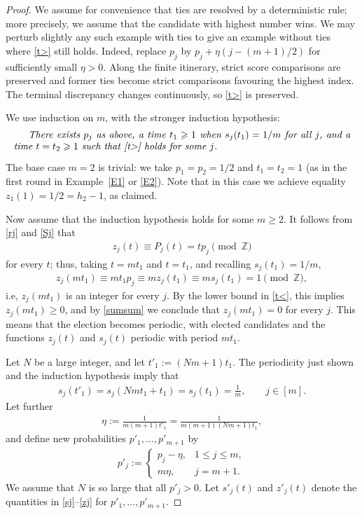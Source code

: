 \documentclass[11pt,reqno,tbtags,a4paper]{amsart}
\numberwithin{equation}{section}
\renewcommand\le{\leq}
\renewcommand\ge{\geq}
\renewcommand\leq{\leqslant}
\renewcommand\geq{\geqslant}
\theoremstyle{plain}%
\theoremstyle{definition}
\theoremstyle{remark}
\newcounter{cases}
\newcommand{\refE}[1]{Example~\ref{#1}}
\newcommand\punkt{\xperiod}    %
\newcommand\ie{i.e\punkt}
\newcommand\bbZ{\mathbb Z}
\newcommand\0{{\boldsymbol 0}}
\newcommand\1{{\boldsymbol 1}}
\begin{document}
\begin{proof}
We assume
for convenience that ties are resolved by a deterministic rule;
more precisely, we assume that the candidate with highest number wins.
We may perturb slightly any such example with ties to give an example
without ties where \eqref{t>} still holds. Indeed, replace $p_j$ by
$p_j+\eta(j-(m+1)/2)$ for sufficiently small $\eta>0$.
Along the finite itinerary, strict score comparisons are preserved and
former ties become strict comparisons favouring the highest index. The terminal discrepancy
changes continuously, so \eqref{t>} is preserved.

We use induction on $m$, with the stronger induction hypothesis:
%
%
%
\begin{equation*}
\vbox{\em There exists $p_j$ as above, a time $t_1\ge1$ when $s_j(t_1)=1/m$ 
for all $j$, and a time $t=t_2\ge1$ such that \eqref{t>} holds for some $j$.}
\end{equation*}
%
The base case $m=2$ is trivial: we take $p_1=p_2=1/2$ and $t_1=t_2=1$
(as in the first round in \refE{E1} or \ref{E2}).
Note that in this case we achieve equality $z_1(1)=1/2=h_2-1$, as claimed.


Now assume that the induction hypothesis holds for some $m\ge2$.
It follows from \eqref{rj} and \eqref{Sj} that
\begin{align}\label{dix4}
  z_j(t)
\equiv  P_j(t)=tp_j \pmod \bbZ
\end{align}
for every $t$; thus, taking $t=mt_1$ and $t=t_1$, and recalling $s_j(t_1)=1/m$, 
\begin{align}\label{dix5}
  z_j(mt_1)\equiv mt_1p_j \equiv mz_j(t_1)
\equiv m s_j(t_1)
=1\pmod\bbZ,
\end{align}
\ie, $z_j(mt_1)$ is an integer for every $j$.
By the lower bound in \eqref{t<}, 
this implies $z_j(mt_1)\ge0$, and by \eqref{sumsum} we
conclude that $z_j(mt_1)=0$ for every $j$. This means that the election
becomes periodic, with elected candidates and the functions $z_j(t)$ and
$s_j(t)$ periodic with period $mt_1$.

Let $N$ be a large integer, 
and let $t'_1:=(Nm+1)t_1$.
The periodicity just shown and the induction hypothesis imply that
\begin{align}\label{dix6}
  s_j(t'_1)=s_j(Nmt_1+t_1)=s_j(t_1)=\frac{1}{m},
\qquad j\in[m].
\end{align}
Let further
\begin{align}\label{dix7}
  \eta:=\frac{1}{m(m+1)t'_1}
=\frac{1}{m(m+1)(Nm+1)t_1},
\end{align}
and define new probabilities
$p'_1,\dots,p'_{m+1}$ by
\begin{align}\label{dix8}
  p'_j:=
  \begin{cases}
    p_j-\eta, & 1\le j\le m,
\\ m\eta, & j=m+1.
  \end{cases}
\end{align}
We assume that $N$ is so large that all $p'_j>0$.
Let $s'_j(t)$ and $z'_j(t)$ denote the quantities in \eqref{sj}--\eqref{zj}
for $p'_1,\dots,p'_{m+1}$.


\end{proof}
\end{document}
